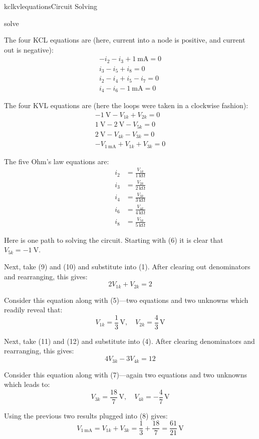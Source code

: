 \begin{mainquestion}{kclkvlequations}{Circuit Solving}
\begin{partquestion}{solve}
\begin{answer}
The four KCL equations are (here, current into a node is positive, and current out is negative):
\begin{gather}
-i_2 - i_3 + \qty{1}{\milli\ampere} = 0 \\
i_3 - i_5 + i_8 = 0 \\
i_2 - i_4 + i_5 - i_7 = 0 \\
i_4 - i_6 - \qty{1}{\milli\ampere} = 0
\end{gather}

The four KVL equations are (here the loops were taken in a clockwise fashion):
\begin{gather}
-\qty{1}{\volt} - V_{1k} + V_{2k} = 0 \\
\qty{1}{\volt} - \qty{2}{\volt} - V_{5k} = 0 \\
\qty{2}{\volt} - V_{4k} - V_{3k} = 0 \\
-V_{\qty{1}{\milli\ampere}} + V_{1k} + V_{3k} = 0
\end{gather}

The five Ohm’s law equations are:
\begin{align}
i_2 &= \frac{V_{1k}}{\qty{1}{\kilo\ohm}} \\
i_3 &= \frac{V_{2k}}{\qty{2}{\kilo\ohm}} \\
i_4 &= \frac{V_{3k}}{\qty{3}{\kilo\ohm}} \\
i_6 &= \frac{V_{4k}}{\qty{4}{\kilo\ohm}} \\
i_8 &= \frac{V_{5k}}{\qty{5}{\kilo\ohm}}
\end{align}

Here is one path to solving the circuit. Starting with (6) it is clear that
$V_{5k} = -\qty{1}{\volt}$.

Next, take (9) and (10) and substitute into (1). After clearing out denominators and rearranging, this gives:
\[
2V_{1k} + V_{2k} = 2
\]

Consider this equation along with (5)—two equations and two unknowns which readily reveal that:
\[
V_{1k} = \frac{1}{3}\,\mathrm{V}, \quad
V_{2k} = \frac{4}{3}\,\mathrm{V}
\]

Next, take (11) and (12) and substitute into (4). After clearing denominators and rearranging, this gives:
\[
4V_{3k} - 3V_{4k} = 12
\]

Consider this equation along with (7)—again two equations and two unknowns which leads to:
\[
V_{3k} = \frac{18}{7}\,\mathrm{V}, \quad
V_{4k} = -\frac{4}{7}\,\mathrm{V}
\]

Using the previous two results plugged into (8) gives:
\[
V_{\qty{1}{\milli\ampere}} = V_{1k} + V_{3k}
= \frac{1}{3} + \frac{18}{7}
= \frac{61}{21}\,\mathrm{V}
\]


\end{answer}
\end{partquestion}
\end{mainquestion}
